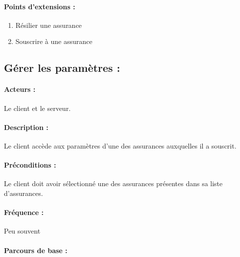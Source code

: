 \documentclass[../annexe.tex]{subfiles}
\begin{document}
\paragraph{Points d'extensions :} 
\begin{enumerate}
	\item Résilier une assurance
	\item Souscrire à une assurance
\end{enumerate}

\newpage

\subsection{Gérer les paramètres :}

\paragraph{Acteurs :} Le client et le serveur.

\paragraph{Description :} Le client accède aux paramètres d'une des assurances auxquelles il a souscrit. 

\paragraph{Préconditions :} Le client doit avoir sélectionné une des assurances présentes dans sa liste d'assurances.

\paragraph{Fréquence :} Peu souvent

\paragraph{Parcours de base :}
\end{document}
